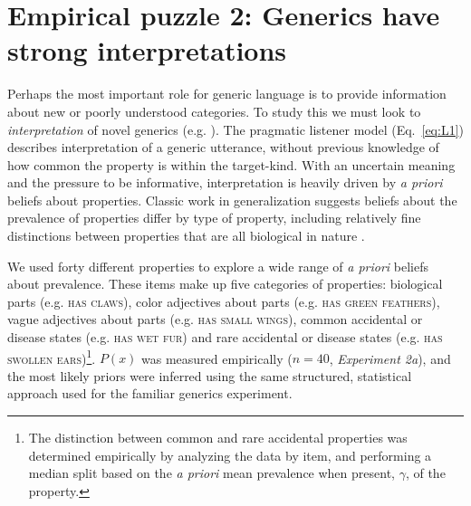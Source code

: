 \documentclass[10pt,letterpaper]{article}
\begin{document}
\section*{Empirical puzzle 2: Generics have strong interpretations}
Perhaps the most important role for generic language is to provide information about new or poorly understood categories. 
To study this we must look to \emph{interpretation} of novel generics (e.g. \cite{Gelman2002, Cimpian2010}).
The pragmatic listener model (Eq.~\ref{eq:L1}) describes interpretation of a generic utterance, without previous knowledge of how common the property is within the target-kind. 
With an uncertain meaning and the pressure to be informative, interpretation is heavily driven by \emph{a priori} beliefs about properties. 
Classic work in generalization suggests beliefs about the prevalence of properties differ by type of property, including relatively fine distinctions between properties that are all biological in nature \cite{Nisbett1983}. 



We used forty different properties to explore a wide range of \emph{a priori} beliefs about prevalence. 
These items make up five categories of properties: biological parts (e.g. \textsc{has claws}), color adjectives about parts (e.g. \textsc{has green feathers}), vague adjectives about parts (e.g. \textsc{has small wings}),  common accidental or disease states (e.g. \textsc{has wet fur}) and rare accidental or disease states (e.g. \textsc{has swollen ears})\footnote{The distinction between common and rare accidental properties was determined empirically by analyzing the data by item, and performing a median split based on the \emph{a priori} mean prevalence when present, $\gamma$, of the property.}.
$P(x)$ was measured empirically ($n=40$, {\it Experiment 2a}), and the most likely priors were inferred using the same structured, statistical approach used for the familiar generics experiment.
\end{document}
